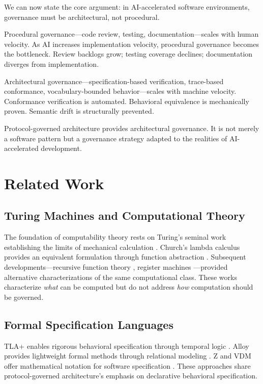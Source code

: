 \documentclass[11pt,a4paper]{article}
\begin{document}
We can now state the core argument: in AI-accelerated software environments, governance must be architectural, not procedural.

Procedural governance---code review, testing, documentation---scales with human velocity. As AI increases implementation velocity, procedural governance becomes the bottleneck. Review backlogs grow; testing coverage declines; documentation diverges from implementation.

Architectural governance---specification-based verification, trace-based conformance, vocabulary-bounded behavior---scales with machine velocity. Conformance verification is automated. Behavioral equivalence is mechanically proven. Semantic drift is structurally prevented.

Protocol-governed architecture provides architectural governance. It is not merely a software pattern but a governance strategy adapted to the realities of AI-accelerated development.



\section{Related Work}
\label{sec:related}

\subsection{Turing Machines and Computational Theory}

The foundation of computability theory rests on Turing's seminal work establishing the limits of mechanical calculation \citep{turing1936computable}. Church's lambda calculus provides an equivalent formulation through function abstraction \citep{church1936unsolvable}. Subsequent developments---recursive function theory \citep{rogers1987theory}, register machines \citep{shepherdson1963computability}---provided alternative characterizations of the same computational class. These works characterize \emph{what} can be computed but do not address \emph{how} computation should be governed.

\subsection{Formal Specification Languages}

TLA+ enables rigorous behavioral specification through temporal logic \citep{lamport2002specifying}. Alloy provides lightweight formal methods through relational modeling \citep{jackson2012software}. Z and VDM offer mathematical notation for software specification \citep{spivey1989z}. These approaches share protocol-governed architecture's emphasis on declarative behavioral specification.
\end{document}

